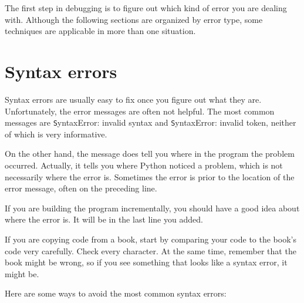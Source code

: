 \documentclass[
DIV=11,
fontsize=12,
twoside,
headinclude=false,
titlepage=firstiscover,
abstract=true,
headsepline=true,
footsepline=true,
chapterprefix=true, %
headings=big,
bibliography=totoc,%
captions=tableheading
]{scrbook}
\theoremstyle{definition}
\begin{document}
The first step in debugging is to figure out which kind of
error you are dealing with.  Although the following sections are
organized by error type, some techniques are
applicable in more than one situation.


\section{Syntax errors}

Syntax errors are usually easy to fix once you figure out what they
are.  Unfortunately, the error messages are often not helpful.
The most common messages are {\texttt SyntaxError: invalid syntax} and
{\texttt SyntaxError: invalid token}, neither of which is very informative.

On the other hand, the message does tell you where in the program the
problem occurred.  Actually, it tells you where Python
noticed a problem, which is not necessarily where the error
is.  Sometimes the error is prior to the location of the error
message, often on the preceding line.

If you are building the program incrementally, you should have
a good idea about where the error is.  It will be in the last
line you added.

If you are copying code from a book, start by comparing
your code to the book's code very carefully.  Check every character.
At the same time, remember that the book might be wrong, so
if you see something that looks like a syntax error, it might be.

Here are some ways to avoid the most common syntax errors:
\end{document}
